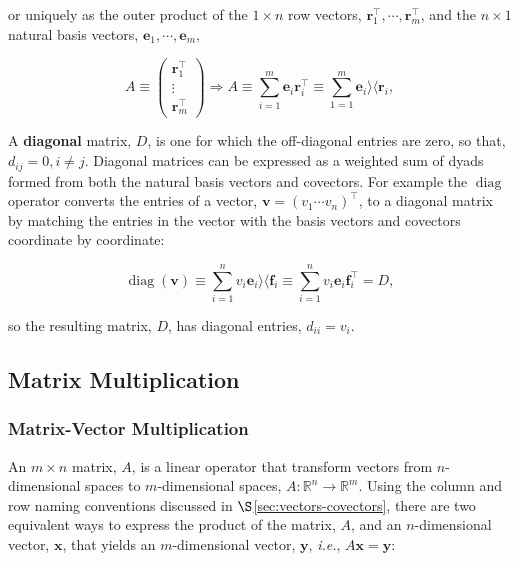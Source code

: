 \documentclass[12pt, twoside, draft]{article}
\begin{document}
or uniquely as the outer product of the $1 \times n$ row vectors, $\mathbf{r}_1^\top, \cdots, \mathbf{r}_m^\top$, and the $n \times 1$ natural basis vectors, $\mathbf{e}_1, \cdots, \mathbf{e}_m$,

\begin{equation}\label{eq:matrix_from_row_basis}
A  \equiv \begin{pmatrix} \mathbf{r}_1^\top \\ \vdots \\ \mathbf{r}_m^\top \end{pmatrix} \Rightarrow A \equiv \sum_{i=1}^m \mathbf{e}_i \mathbf{r}_i^\top \equiv \sum_{1=1}^m \mathbf{e}_i \rangle \langle \mathbf{r}_i,
\end{equation}

A \textbf{diagonal} matrix, $D$, is one for which the off-diagonal entries are zero, so that, $d_{ij} = 0, i \neq j$.  Diagonal matrices can be expressed as a weighted sum of dyads formed from both the natural basis vectors and covectors.  For example the $\operatorname{diag}$ operator converts the entries of a vector, $\mathbf{v} = (v_1 \cdots v_n)^\top$, to a diagonal matrix by matching the entries in the vector with the basis vectors and covectors coordinate by coordinate:

\begin{equation}\label{eq:outer_product_diagonal}
\operatorname{diag} (\mathbf{v}) \equiv \sum_{i=1}^n v_i \mathbf{e}_i \rangle \langle \mathbf{f}_i \equiv \sum_{i=1}^n v_i \mathbf{e}_i \mathbf{f}_i^\top = D,
\end{equation}

so the resulting matrix, $D$, has diagonal entries, $d_{ii} = v_i$.

\subsection{Matrix Multiplication}\label{sec:matrix-multiplication}
\subsubsection{Matrix-Vector Multiplication}\label{sec:matrix-vector-multiplication}
An $m \times n$ matrix, $A$, is a linear operator that transform vectors from $n$-dimensional spaces to $m$-dimensional spaces, $A: \mathbb{R}^n \rightarrow \mathbb{R}^m$. Using the column and row naming conventions discussed in $\S$\ref{sec:vectors-covectors}, there are two equivalent ways to express the product of the matrix, $A$, and an $n$-dimensional vector, $\mathbf{x}$, that yields an $m$-dimensional vector, $\mathbf{y}$, \textit{i.e.}, $A\mathbf{x} = \mathbf{y}$:
\end{document}
